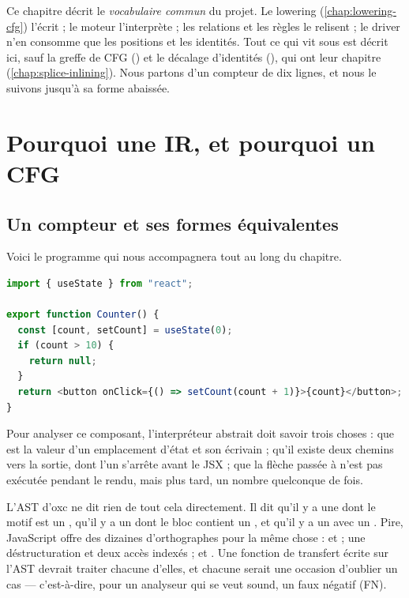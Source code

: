 Ce chapitre décrit le \emph{vocabulaire commun} du projet. Le lowering (\cref{chap:lowering-cfg}) l'écrit ; le moteur l'interprète ; les relations et les règles le relisent ; le driver n'en consomme que les positions et les identités. Tout ce qui vit sous  est décrit ici, sauf la greffe de CFG () et le décalage d'identités (), qui ont leur chapitre (\cref{chap:splice-inlining}). Nous partons d'un compteur de dix lignes, et nous le suivons jusqu'à sa forme abaissée.

\section{Pourquoi une IR, et pourquoi un CFG}
\label{sec:ir-pourquoi}

\subsection{Un compteur et ses formes équivalentes}

Voici le programme qui nous accompagnera tout au long du chapitre.

\begin{lstlisting}[language=TypeScript,caption={Un compteur avec retour anticipé (\file{/tmp/ch06/counter.tsx})},label={lst:ir-counter}]
import { useState } from "react";

export function Counter() {
  const [count, setCount] = useState(0);
  if (count > 10) {
    return null;
  }
  return <button onClick={() => setCount(count + 1)}>{count}</button>;
}
\end{lstlisting}

Pour analyser ce composant, l'interpréteur abstrait doit savoir trois choses : que  est la valeur d'un emplacement d'état et  son écrivain ; qu'il existe deux chemins vers la sortie, dont l'un s'arrête avant le JSX ; que la flèche passée à  n'est pas exécutée pendant le rendu, mais plus tard, un nombre quelconque de fois.

L'AST d'oxc ne dit rien de tout cela directement. Il dit qu'il y a une  dont le motif est un , qu'il y a un  dont le bloc contient un , et qu'il y a un  avec un . Pire, JavaScript offre des dizaines d'orthographes pour la même chose :  et  ; une déstructuration et deux accès indexés ;  et . Une fonction de transfert écrite sur l'AST devrait traiter chacune d'elles, et chacune serait une occasion d'oublier un cas --- c'est-à-dire, pour un analyseur qui se veut sound, un faux négatif (FN).

